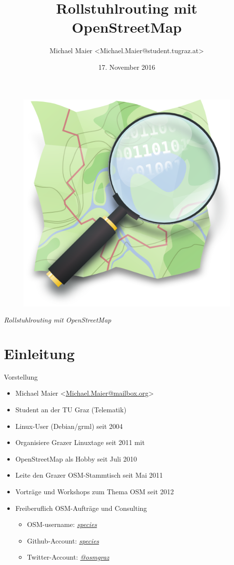 \documentclass{beamer}
\title{Rollstuhlrouting mit OpenStreetMap}
\author{Michael Maier \textless Michael.Maier@student.tugraz.at\textgreater}
\date{17. November 2016}
\begin{document}

\begin{frame} 


\begin{figure}
  \centering
  \includegraphics[width=.4\textwidth]{mag_map.png}
\end{figure}

\begin{center}
\Large{\emph{Rollstuhlrouting mit OpenStreetMap}}
\end{center}

\end{frame}


\section{Einleitung}

\begin{frame}{Vorstellung}

  \begin{itemize}
    \item Michael Maier \textless \href{mailto:Michael.Maier@mailbox.org}{Michael.Maier@mailbox.org}\textgreater
    \item Student an der TU Graz (Telematik)
\vspace{0.3cm}
    \item Linux-User (Debian/grml) seit 2004
    \item Organisiere Grazer Linuxtage seit 2011 mit
    \item OpenStreetMap als Hobby seit Juli 2010
    \item Leite den Grazer OSM-Stammtisch seit Mai 2011
\vspace{0.3cm}
    \item Vorträge und Workshops zum Thema OSM seit 2012
    \item Freiberuflich OSM-Aufträge und Consulting
    \begin{itemize}
      \item OSM-username: \emph{\href{http://www.openstreetmap.org/user/species}{species}}
      \item Github-Account: \emph{\href{https://github.com/species}{species}}
      \item Twitter-Account: \emph{\href{https://twitter.com/osmgraz}{@osmgraz}}
    \end{itemize}
  \end{itemize}
\end{frame}
\end{document}
